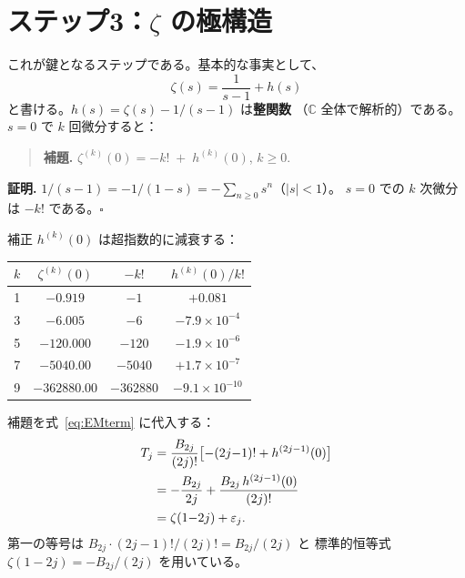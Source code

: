 \documentclass[11pt,a4paper]{article}
\begin{document}
\section{ステップ3：$\zeta$ の極構造}

これが鍵となるステップである。基本的な事実として、
\begin{equation}\label{eq:decomp}
  \zeta(s) = \frac{1}{s-1} + h(s)
\end{equation}
と書ける。$h(s)=\zeta(s)-1/(s-1)$ は\textbf{整関数}
（$\mathbb{C}$ 全体で解析的）である。$s=0$ で $k$ 回微分すると：

\begin{quote}
\textbf{補題.}\quad
$\zeta^{(k)}(0)=-k!\;+\;h^{(k)}(0)$, \quad $k\geq 0$.
\end{quote}

\textbf{証明.}\quad
$1/(s-1)=-1/(1-s)=-\sum_{n\geq 0}s^n$（$|s|<1$）。
$s=0$ での $k$ 次微分は $-k!$ である。$\square$

\medskip

補正 $h^{(k)}(0)$ は超指数的に減衰する：

\begin{center}
\begin{tabular}{c|c|c|c}
\hline
$k$ & $\zeta^{(k)}(0)$ & $-k!$ & $h^{(k)}(0)/k!$ \\
\hline
1 & $-0.919$ & $-1$ & $+0.081$ \\
3 & $-6.005$ & $-6$ & $-7.9\times 10^{-4}$ \\
5 & $-120.000$ & $-120$ & $-1.9\times 10^{-6}$ \\
7 & $-5040.00$ & $-5040$ & $+1.7\times 10^{-7}$ \\
9 & $-362880.00$ & $-362880$ & $-9.1\times 10^{-10}$ \\
\hline
\end{tabular}
\end{center}

補題を式~\eqref{eq:EMterm} に代入する：
\begin{align}
  T_j &= \frac{B_{2j}}{(2j)!}\bigl[-(2j{-}1)!+h^{(2j-1)}(0)\bigr]\notag\\
  &= -\frac{B_{2j}}{2j}+\frac{B_{2j}\,h^{(2j-1)}(0)}{(2j)!}\notag\\
  &= \zeta(1{-}2j)+\varepsilon_j.\label{eq:Tj}
\end{align}
第一の等号は $B_{2j}\cdot(2j{-}1)!/(2j)!=B_{2j}/(2j)$ と
標準的恒等式 $\zeta(1{-}2j)=-B_{2j}/(2j)$ を用いている。
\end{document}
